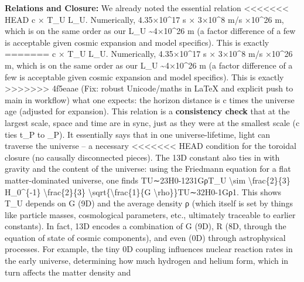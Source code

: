 \documentclass[]{article}
\begin{document}
{\textbf{Relations and Closure:} We already noted the essential relation
<<<<<<< HEAD
c × T\_U \approx L\_U\hspace{0pt}. Numerically, 4.35×10\^{}17 s × 3×10\^{}8
m/s ×10\^{}26 m, which is on the same order as our L\_U
\textasciitilde4×10\^{}26 m (a factor difference of a few is acceptable
given cosmic expansion and model specifics)\hspace{0pt}. This is exactly
=======
c × T\_U \approx L\_U​. Numerically, 4.35×10\^{}17 s × 3×10\^{}8 m/s ×10\^{}26 m, which is on the same order as our L\_U
\textasciitilde{}4×10\^{}26 m (a factor difference of a few is
acceptable given cosmic expansion and model specifics)​. This is exactly
>>>>>>> 4f5eaae (Fix: robust Unicode/maths in LaTeX and explicit push to main in workflow)
what one expects: the horizon distance is c times the universe age
(adjusted for expansion). This relation is a \textbf{consistency check}
that at the largest scale, space and time are in sync, just as they were
at the smallest scale (c ties t\_P to \ell\_P). It essentially says that in
one universe-lifetime, light can traverse the universe -- a necessary
<<<<<<< HEAD
condition for the toroidal closure (no causally disconnected
pieces)\hspace{0pt}. The 13D constant also ties in with gravity and the
content of the universe: using the Friedmann equation for a flat
matter-dominated universe, one finds TU∼23H0-1\approx231GρT\_U
\textbackslash sim \textbackslash frac\{2\}\{3\} H\_0\^{}\{-1\} \approx
\textbackslash frac\{2\}\{3\}
\textbackslash sqrt\{\textbackslash frac\{1\}\{G
\textbackslash rho\}\}TU\hspace{0pt}∼32\hspace{0pt}H0-1\hspace{0pt}\hspace{0pt}Gρ1\hspace{0pt}\hspace{0pt}\hspace{0pt}.
This shows T\_U depends on G (9D) and the average density ρ (which
itself is set by things like particle masses, cosmological parameters,
etc., ultimately traceable to earlier constants). In fact, 13D encodes a
combination of G (9D), R (8D, through the equation of state of cosmic
components), and even \alpha (0D) through astrophysical
processes\hspace{0pt}. For example, the tiny 0D coupling \alpha influences
nuclear reaction rates in the early universe, determining how much
hydrogen and helium form, which in turn affects the matter density and
}
\end{document}
